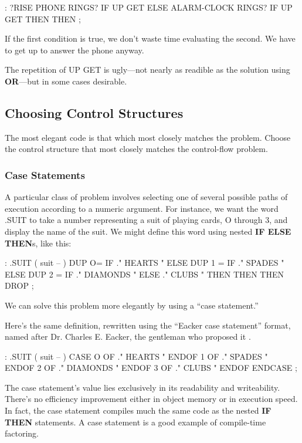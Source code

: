 \begin{Code}
: ?RISE   PHONE RINGS? IF  UP GET  ELSE
     ALARM-CLOCK RINGS?  IF UP GET THEN THEN  ;
\end{Code}
If the first condition is true, we don't waste time evaluating the second.
We have to get up to answer the phone anyway.

The repetition of UP GET is ugly---not nearly as readible as the
solution using \textbf{OR}---but in some cases desirable.

\subsection{Choosing Control Structures}
\begin{tip}
The most elegant code is that which most closely matches the problem.
Choose the control structure that most closely matches the control-flow
problem.
\end{tip}
\subsubsection{Case Statements}

A particular class of problem involves selecting one of several possible
paths of execution according to a numeric argument. For instance, we
want the word .SUIT to take a number representing a suit of playing
cards, O through 3, and display the name of the suit. We might define this
word using nested \textbf{IF ELSE THEN}s, like this:

\begin{Code}
: .SUIT ( suit -- )
  DUP  O=  IF ." HEARTS "   ELSE
  DUP  1 = IF ." SPADES "   ELSE
  DUP  2 = IF ." DIAMONDS " ELSE
              ." CLUBS "
  THEN THEN THEN  DROP ;
\end{Code}
We can solve this problem more elegantly by using a ``case statement.''

Here's the same definition, rewritten using the ``Eacker case statement''
format, named after Dr. Charles E. Eacker, the gentleman who proposed
it \cite{eaker}.

\begin{Code}
: .SUIT ( suit -- )
  CASE
  O OF   ." HEARTS "    ENDOF
  1 OF   ." SPADES "    ENDOF
  2 OF   ." DIAMONDS "  ENDOF
  3 OF   ." CLUBS "     ENDOF     ENDCASE ;
\end{Code}
The case statement's value lies exclusively in its readability and
writeability. There's no efficiency improvement either in object memory
or in execution speed. In fact, the case statement compiles much the
same code as the nested \textbf{IF THEN} statements. A case statement is a
good example of compile-time factoring.

